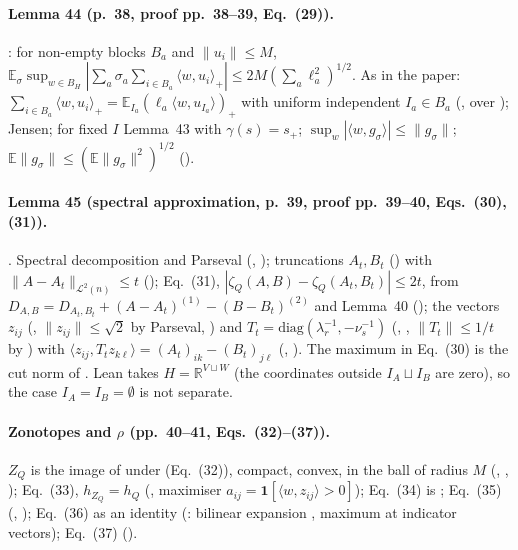 \paragraph{Lemma 44 (p.~38, proof pp.~38--39, Eq.~(29)).} : for non-empty blocks $B_a$ and
$\|u_i\|\le M$, $\mathbb E_\sigma\sup_{w\in B_H}|\sum_a\sigma_a\sum_{i\in B_a}\langle w,u_i\rangle_+|\le2M(\sum_a\ell_a^2)^{1/2}$.
As in the paper: $\sum_{i\in B_a}\langle w,u_i\rangle_+=\mathbb E_{I_a}(\ell_a\langle w,u_{I_a}\rangle)_+$ with uniform
independent $I_a\in B_a$ (, over ); Jensen; for fixed $I$ Lemma~43 with
$\gamma(s)=s_+$; $\sup_w|\langle w,g_\sigma\rangle|\le\|g_\sigma\|$; $\mathbb E\|g_\sigma\|\le(\mathbb E\|g_\sigma\|^2)^{1/2}$
().

\paragraph{Lemma 45 (spectral approximation, p.~39, proof pp.~39--40, Eqs.~(30), (31)).} . Spectral decomposition and
Parseval (, ); truncations $A_t,B_t$ () with
$\|A-A_t\|_{\mathcal L^2(n)}\le t$ (); Eq.~(31), $|\zeta_Q(A,B)-\zeta_Q(A_t,B_t)|\le2t$, from
$D_{A,B}=D_{A_t,B_t}+(A-A_t)^{(1)}-(B-B_t)^{(2)}$ and Lemma~40 (); the vectors $z_{ij}$ (,
$\|z_{ij}\|\le\sqrt2$ by Parseval, ) and $T_t=\mathrm{diag}(\lambda_r^{-1},-\nu_s^{-1})$
(, , $\|T_t\|\le1/t$ by ) with
$\langle z_{ij},T_tz_{k\ell}\rangle=(A_t)_{ik}-(B_t)_{j\ell}$ (, ).
The maximum in Eq.~(30) is the cut norm of . Lean takes $H=\mathbb R^{V\sqcup W}$ (the coordinates
outside $I_A\sqcup I_B$ are zero), so the case $I_A=I_B=\emptyset$ is not separate.

\paragraph{Zonotopes and $\rho$ (pp.~40--41, Eqs.~(32)--(37)).} $Z_Q$ is the image of  under  (Eq.~(32)),
compact, convex, in the ball of radius $M$ (, ,
); Eq.~(33), $h_{Z_Q}=h_Q$ (, maximiser $a_{ij}=\mathbf 1[\langle w,z_{ij}\rangle>0]$);
Eq.~(34) is ; Eq.~(35) (, ); Eq.~(36) as an identity
(: bilinear expansion , maximum at indicator vectors); Eq.~(37) ().

